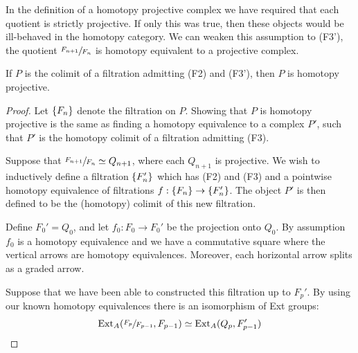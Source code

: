 \documentclass[../thesis.tex]{subfiles}
\begin{document}
            In the definition of a homotopy projective complex we have required that each quotient is strictly projective. If only this was true, then these objects would be ill-behaved in the homotopy category. We can weaken this assumption to (F3'), the quotient $\sfrac{F_{n+1}}{F_n}$ is homotopy equivalent to a projective complex.

            \begin{lemma}\label{lem: homo-proj-homo-well-def}
                If $P$ is the colimit of a filtration admitting (F2) and (F3'), then $P$ is homotopy projective.
            \end{lemma}

            \begin{proof}
                Let $\{F_n\}$ denote the filtration on $P$. Showing that $P$ is homotopy projective is the same as finding a homotopy equivalence to a complex $P'$, such that $P'$ is the homotopy colimit of a filtration admitting (F3).

                Suppose that $\sfrac{F_{n+1}}{F_n}\simeq Q_{n+1}$, where each $Q_{n+1}$ is projective. We wish to inductively define a filtration $\{F_n'\}$ which has (F2) and (F3) and a pointwise homotopy equivalence of filtrations $f : \{F_n\} \rightarrow \{F_n'\}$. The object $P'$ is then defined to be the (homotopy) colimit of this new filtration.
                
                Define $F_0' = Q_0$, and let $f_0 : F_0 \rightarrow F_0'$ be the projection onto $Q_0$. By assumption $f_0$ is a homotopy equivalence and we have a commutative square where the vertical arrows are homotopy equivalences. Moreover, each horizontal arrow splits as a graded arrow.

                \begin{center}
                \end{center}

                Suppose that we have been able to constructed this filtration up to $F_p'$. By using our known homotopy equivalences there is an isomorphism of Ext groups:
                \begin{align*}
                    \text{Ext}_A(\sfrac{F_{p}}{F_{p-1}}, F_{p-1})\simeq \text{Ext}_A(Q_p, F_{p-1}')
                \end{align*}


\end{proof}
\end{document}
